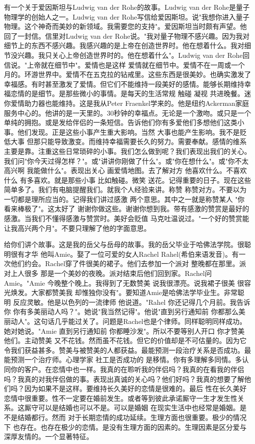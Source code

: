 有一个关于爱因斯坦与Ludwig van der Rohe的故事。Ludwig van der Rohe是量子物理学的创始人之一。Ludwig van der Rohe写信给爱因斯坦。说"我想你进入量子物理。这个神奇而美妙的新领域。我需要您的支持"。爱因斯坦当时颇有声望。他回了一封信。信里对Ludwig van der Rohe说。"我对量子物理不感兴趣。因为我对细节上的东西不感兴趣。我感兴趣的是上帝在创造世界时。他在想着什么。我对细节没兴趣。我只关心上帝创造世界时的。他在想着什么"。Ludwig van der Rohe回信说。"上帝就在细节中"。爱情也是这样 爱情就在细节中。爱情不在一周或一个月的。环游世界中。爱情不在五克拉的钻戒里。这些东西是很美妙。也确实激发了幸福感。有时甚至激发了爱情。但它们不能维持一段美好的感情。能够长期维持幸福恋情的是细节。是那些微小的事情。是每天的生活常规 触碰 凝视 共进晚餐。迷你爱情助力器也能维持。这是我从Peter Fraenkel学来的。他是纽约Ackerman家庭服务中心的。他讲的是一天里的。30秒钟的幸福点。无论是一个激吻。或只是一个单纯的拥抱。或是发给伴侣的一条短信。告诉他们你有多爱他们多想他们这类小事。他们发现。正是这些小事产生重大影响。当然 大事也能产生影响。我不是贬低大事 但那只能导致激变。而维持幸福需要长久的努力。需要奉献。感情的维系主要是靠。注重这些日常琐碎的小事。我们怎么做到呢？我们表现出我们的关心。我们问"你今天过得怎样？"。或"讲讲你刚做了什么"。或"你在想什么"。或"你不太高兴啊 我能做什么"。表现出关心 画爱情地图。去了解对方 他喜欢什么。不喜欢什么 有多喜欢。就是那些小事 比如触碰。微笑 送花。记得重要的日子。现在这些简单多了。我们有电脑提醒我们。就我个人经验来讲。称赞 称赞对方。不要以为一切都是理所应当的。记得我们讲过感激 两个意思。其中之一就是称赞某人 "你看来棒极了"。这太好了 谢谢你做这些。谢谢你想到我。带有感激的赞赏是最好的感激。当我们不懂得感激与赞赏时。美好会贬值 马克吐温说过。"一个好的赞赏能让我高兴两个月"。不要只理解了他的字面意思。 

给你们讲个故事。这是我的岳父与岳母的故事。我的岳父毕业于哈佛法学院。很聪明很有才华 他叫Amie。娶了一位可爱的女人Rachel Rahel(希伯来语发音)。有一次他们约会。Rachel穿了件很美的裙子。他们去参加一个派对 整晚都在那里。派对上人很多 那是一个美妙的夜晚。派对结束后他们回到家。Rachel问Amie。"Amie 今晚整个晚上。我得到了无数赞美 说我很漂亮。说我裙子很美 很容光焕发。大家都赞美我 却惟独你没有"。要知道Amie是哈佛法学毕业生。非常聪明 反应灵敏。他是以色列的一流律师 他说道。"Rahel 你还记得几个月前。我告诉你 你有多美丽动人吗？"。她说"我当然记得"。他说"直到另行通知前 你都那么美丽动人"。这句话几乎能过关了。问题是Rachel也是个律师。同样聪明同样成功。她对她说。"Amie 直到另行通知前 你都睡沙发"。所以不要等别人开口 你才赞美他们。主动赞美 又不花钱。然而虽不花钱。但它的价值却是不可估量的。因为它令我们获益甚多。赞美与被赞美的人都获益。最能预测一段治疗关系是否成功。最能预测一个治疗师。心理学家 社工是否成功的 是移情。你有多理解多同情。多认同你的客户。在恋情中也一样。我真的在聆听我的伴侣吗？我真的在看我的伴侣吗？我真的对我伴侣做的事。表现出真诚的关心吗？他们好吗？我真的想要了解他们吗？因为如果不是这样。要维持长久美好的恋情是很难的。最后 性在长久美好恋情中很重要。性不一定要在婚前发生。或者等到彼此承诺厮守一生才发生性关系。这厮守可以是结婚也可以不是。可以是婚姻 在现实生活中也经常是婚姻。是不是结婚都行。然而 对于长期恋情的成功延续。生理方面也很重要。极少的情况下 也存在。也存在极少的恋情。是没有生理方面的因素的。生理因素是区分爱与深厚友情的。一个显著特征。 

